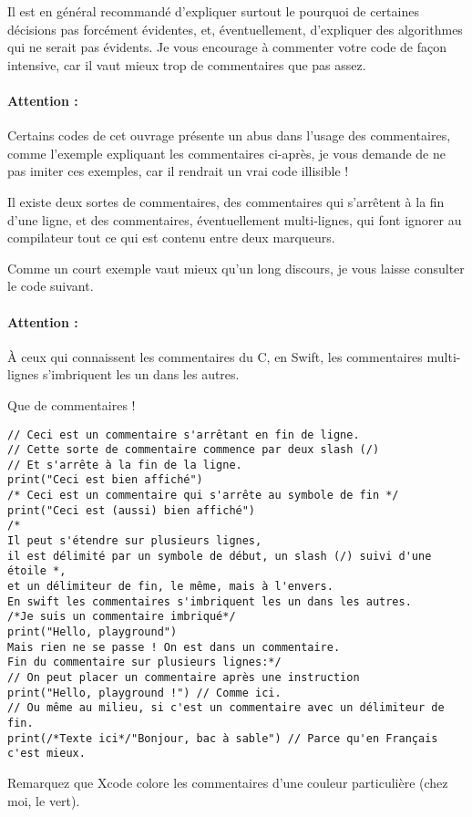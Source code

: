 Il est en général recommandé d'expliquer surtout
le pourquoi de certaines décisions pas forcément évidentes,
et, éventuellement, d'expliquer des algorithmes qui ne serait pas évidents.
Je vous encourage à commenter votre code de façon intensive,
car il vaut mieux trop de commentaires que pas assez.

\paragraph{Attention :}
Certains codes de cet ouvrage présente un abus dans l'usage des commentaires,
comme l'exemple expliquant les commentaires ci-après,
je vous demande de ne pas imiter ces exemples,
car il rendrait un vrai code illisible !

Il existe deux sortes de commentaires,
des commentaires qui s'arrêtent à la fin d'une ligne,
et des commentaires, éventuellement multi-lignes,
qui font ignorer au compilateur tout ce qui est contenu entre deux marqueurs.

Comme un court exemple vaut mieux qu’un long discours,
je vous laisse consulter le code suivant.

\paragraph{Attention :} À ceux qui connaissent les commentaires du C,
en Swift, les commentaires multi-lignes s'imbriquent les un dans les autres.

\begin{listing}[H]
\caption{Que de commentaires !}
\begin{verbatim}
// Ceci est un commentaire s'arrêtant en fin de ligne.
// Cette sorte de commentaire commence par deux slash (/)
// Et s'arrête à la fin de la ligne.
print("Ceci est bien affiché")
/* Ceci est un commentaire qui s'arrête au symbole de fin */
print("Ceci est (aussi) bien affiché")
/*
Il peut s'étendre sur plusieurs lignes,
il est délimité par un symbole de début, un slash (/) suivi d'une étoile *,
et un délimiteur de fin, le même, mais à l'envers.
En swift les commentaires s'imbriquent les un dans les autres.
/*Je suis un commentaire imbriqué*/
print("Hello, playground")
Mais rien ne se passe ! On est dans un commentaire.
Fin du commentaire sur plusieurs lignes:*/
// On peut placer un commentaire après une instruction
print("Hello, playground !") // Comme ici.
// Ou même au milieu, si c'est un commentaire avec un délimiteur de fin.
print(/*Texte ici*/"Bonjour, bac à sable") // Parce qu'en Français c'est mieux.
\end{verbatim}
\end{listing}
Remarquez que Xcode colore les commentaires d'une couleur particulière (chez moi, le vert).

